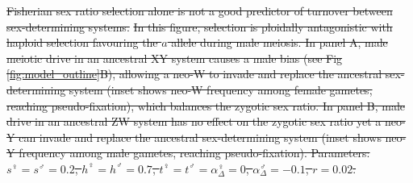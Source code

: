 \documentclass[10pt,letterpaper]{article}
\providecommand{\DIFdel}[1]{{\protect\color{red}\sout{#1}}}                      %
\providecommand{\DIFdelbegin}{} %
\providecommand{\DIFdelFL}[1]{\DIFdel{#1}} %
\begin{document}
\DIFdelbegin %
{%
\DIFdelFL{Fisherian sex ratio selection alone is not a good predictor of turnover between sex-determining systems.}%
\DIFdelFL{In this figure, selection is ploidally antagonistic with haploid selection favouring the $a$ allele during male meiosis.
In panel A, male meiotic drive in an ancestral XY system causes a male bias (see Fig \ref{fig:model_outline}B), allowing a neo-W to invade and replace the ancestral sex-determining system (inset shows neo-W frequency among female gametes, reaching pseudo-fixation), which balances the zygotic sex ratio.
In panel B, male drive in an ancestral ZW system has no effect on the zygotic sex ratio yet a neo-Y can invade and replace the ancestral sex-determining system (inset shows neo-Y frequency among male gametes, reaching pseudo-fixation). 
Parameters:  $s^\female =s^\male = 0.2$, $h^\female = h^\male = 0.7$, $t^\female = t^\male = \alpha^\female_\Delta = 0$, $\alpha^\male_\Delta = -0.1$, $r=0.02$.
}}
\end{document}
